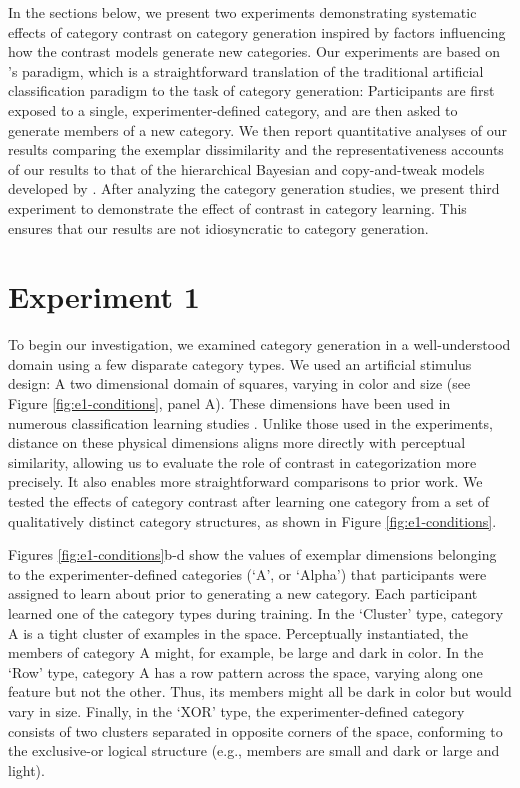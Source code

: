 \documentclass[12pt]{article}
\begin{document}
\begin{flushleft}
In the sections below, we present two experiments demonstrating systematic
effects of category contrast on category generation inspired by factors
influencing how the contrast models generate new categories. Our experiments are
based on \cite{jern2013probabilistic}'s paradigm, which is a straightforward
translation of the traditional artificial classification paradigm to the task of
category generation: Participants are first exposed to a single,
experimenter-defined category, and are then asked to generate members of a new
category. We then report quantitative analyses of our results comparing the exemplar dissimilarity
and the representativeness accounts of our results to that of the hierarchical
Bayesian and copy-and-tweak models developed by \cite{jern2013probabilistic}.
After analyzing the category generation studies, we present third experiment to
demonstrate the effect of contrast in category learning. This ensures that our
results are not idiosyncratic to category generation.

\section{Experiment 1}
To begin our investigation, we examined category generation in a well-understood domain using a few disparate category types. We used an
artificial stimulus design: A two dimensional domain of squares, varying in
color and size (see Figure \ref{fig:e1-conditions}, panel A). These dimensions
have been used in numerous classification learning studies
\cite[e.g.,][]{conaway2016similar,conaway2016generalization,shepard1961learning,nosofsky1994comparing}.
Unlike those used in the \cite{jern2013probabilistic} experiments, distance on
these physical dimensions aligns more directly with perceptual similarity,
allowing us to evaluate the role of  contrast in categorization
more precisely. It also enables more straightforward comparisons to prior work. We tested the effects of category contrast after learning one category from a set of qualitatively distinct category structures, as shown in Figure \ref{fig:e1-conditions}.

Figures \ref{fig:e1-conditions}b-d show the values of exemplar dimensions
belonging to the experimenter-defined categories (`A', or `Alpha') that
participants were assigned to learn about prior to generating a new category.
Each participant learned one of the category types during training. In the
`Cluster' type, category A is a tight cluster of examples in the space.
Perceptually instantiated, the members of category A might, for example, be
large and dark in color. In the `Row' type, category A has a row pattern across
the space, varying along one feature but not the other. Thus, its members might
all be dark in color but would vary in size. Finally, in the `XOR' type, the
experimenter-defined category consists of two clusters separated in opposite
corners of the space, conforming to the exclusive-or logical structure (e.g.,
members are small and dark or large and light).


\end{flushleft}
\end{document}
